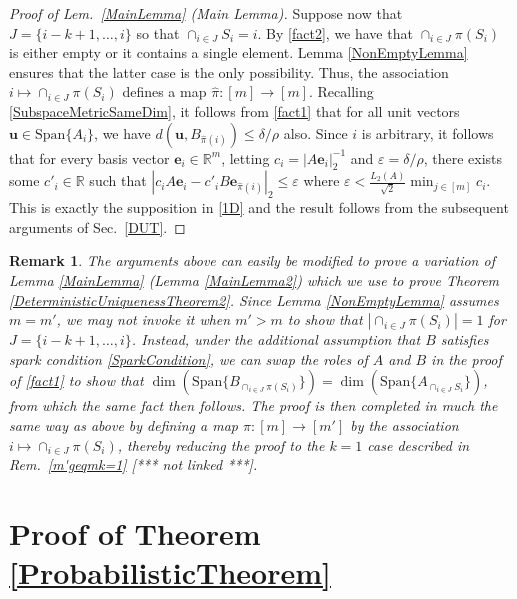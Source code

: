 \documentclass[journal, twocolumn]{IEEEtran}
\newtheorem{remark}{Remark}
\begin{document}
\begin{proof}[Proof of Lem.~\ref{MainLemma} (Main Lemma)]
Suppose now that $J = \{i-k+1, \ldots, i\}$ so that $\cap_{i \in J} S_i = i$. By \eqref{fact2}, we have that $\cap_{i \in J} \pi(S_i)$ is either empty or it contains a single element. Lemma \ref{NonEmptyLemma} ensures that the latter case is the only possibility. Thus, the association $i \mapsto \cap_{i \in J} \pi(S_i)$ defines a map $\hat \pi: [m] \to [m]$. Recalling \eqref{SubspaceMetricSameDim}, it follows from \eqref{fact1} that for all unit vectors $\mathbf{u} \in \text{Span}\{A_i\}$, we have $d\left( \mathbf{u}, B_{\hat \pi(i)}\right) \leq \delta/\rho$ also. Since $i$ is arbitrary, it follows that for every basis vector $\mathbf{e}_i \in \mathbb{R}^m$, letting $c_i = |A\mathbf{e}_i|_2^{-1}$ and $\varepsilon = \delta/\rho$, there exists some $c'_i \in \mathbb{R}$ such that $|c_iA\mathbf{e}_i - c'_iB\mathbf{e}_{\hat \pi(i)}|_2 \leq \varepsilon$ where $\varepsilon < \frac{L_2(A)}{\sqrt{2}} \min_{j \in [m]} c_i$. This is exactly the supposition in \eqref{1D} and the result follows from the subsequent arguments of Sec.~\ref{DUT}. 
\end{proof}

\begin{remark}
The arguments above can easily be modified to prove a variation of Lemma \ref{MainLemma} (Lemma \ref{MainLemma2}) which we use to prove Theorem \ref{DeterministicUniquenessTheorem2}. Since Lemma \ref{NonEmptyLemma} assumes $m = m'$, we may not invoke it when $m' > m$ to show that $|\cap_{i \in J} \pi(S_i)| = 1$ for $J = \{i-k+1, \ldots, i\}$. Instead, under the additional assumption that $B$ satisfies spark condition \eqref{SparkCondition}, we can swap the roles of $A$ and $B$ in the proof of \eqref{fact1} to show that $\dim(\text{Span}\{B_{\cap_{i \in J}\pi(S_i)}\}) = \dim(\text{Span}\{A_{\cap_{i \in J} S_i}\})$, from which the same fact then follows. The proof is then completed in much the same way as above by defining a map $\pi: [m] \to [m']$ by the association $i \mapsto \cap_{i \in J} \pi(S_i)$, thereby reducing the proof to the $k=1$ case described in Rem.~\ref{m'geqmk=1} [*** not linked ***].
\end{remark}


\section{Proof of Theorem \ref{ProbabilisticTheorem}}
\end{document}
